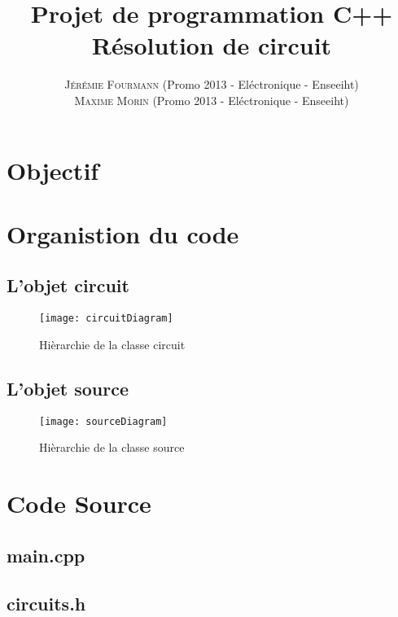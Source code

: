 \documentclass[a4paper,11pt]{article}
\title{\textbf{ \huge{Projet de programmation C++}} \\{\Large  Résolution de circuit}}
\author{
\textsc{Jérémie Fourmann} (Promo 2013 - Eléctronique - Enseeiht)\\ %
\textsc{Maxime Morin} (Promo 2013 - Eléctronique - Enseeiht)\\ %
}
\begin{document}
\pagestyle{plain}

\maketitle
\vspace{1cm}
\renewcommand{\contentsname}{Plan}
\tableofcontents
\vspace{2cm}



\newpage



\section{Objectif}
\section{Organistion du code}
  \subsection{L'objet circuit}
    \begin{figure}[H]
	 \begin{center}
	\texttt{[image: circuitDiagram]}
	\caption{Hièrarchie de la classe circuit}
	\end{center}
      \end{figure}

  \subsection{L'objet source}
    \begin{figure}[H]
	 \begin{center}
	\texttt{[image: sourceDiagram]}
	\caption{Hièrarchie de la classe source}
	\end{center}
      \end{figure}
\newpage
\section{Code Source}
  \subsection{main.cpp}
    
    \newpage
  \subsection{circuits.h}
    
    \newpage
\end{document}
